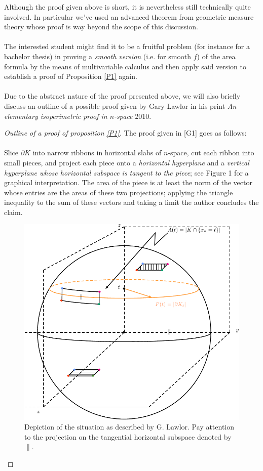 \documentclass[12pt, a4paper, titlepage]{article}
\begin{document}
Although the proof given above is short, it is nevertheless still technically quite involved. In particular we've used an advanced theorem from geometric measure theory whose proof is way beyond the scope of this discussion. 
\\\\
The interested student might find it to be a fruitful problem (for instance for a bachelor thesis) in proving a \textit{smooth version} (i.e. for smooth $f$) of the area formula by the means of multivariable calculus and then apply said version to establish a proof of Proposition \ref{P1} again. 
\\\\
Due to the abstract nature of the proof presented above, we will also briefly discuss an outline of a possible proof given by Gary Lawlor in his print \textit{An elementary isoperimetric proof in $n$-space} 2010. \newpage
\begin{proof}[Outline of a proof of proposition \ref{P1}] The proof given in [G1] goes as follows: \\
\\Slice $\partial K$ into narrow ribbons in horizontal slabs of $n$-space, cut each ribbon into
small pieces, and project each piece onto a \textit{horizontal hyperplane} and a \textit{vertical hyperplane
whose horizontal subspace is tangent to the piece}; see Figure 1 for a graphical interpretation. The area of the piece is at least the
norm of the vector whose entries are the areas of these two projections; applying the
triangle inequality to the sum of these vectors and taking a limit the author concludes the claim. 
\begin{figure}[hbtp]
\centering
\includegraphics[scale=.9]{images/proof.pdf}
\caption{Depiction of the situation as described by G. Lawlor. Pay attention to the projection on the tangential horizontal subspace denoted by $\|$.}
\end{figure}
\end{proof}
\end{document}
